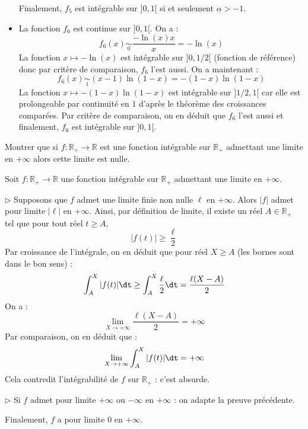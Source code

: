 \documentclass[a4paper,10pt]{report}
\begin{document}
\begin{itemize}
\medskip

\noindent Finalement, $f_5$ est intégrable sur $]0,1[$ si et seulement $\alpha>-1$.
 \item La fonction $f_6$ est continue sur $]0,1[$. On a :
 $$f_6(x) \underset{0}{\sim} \dfrac{- \ln(x) x}{x} = - \ln(x)$$
 La fonction $x \mapsto - \ln(x)$ est intégrable sur $]0,1/2[$ (fonction de référence) donc par critère de comparaison, $f_6$ l'est aussi. On a maintenant :
 $$ f_6(x) \underset{1}{\sim} (x-1) \ln(1-x) = - (1-x)\ln(1-x)$$
 La fonction $x \mapsto -(1-x)\ln(1-x)$ est intégrable sur $]1/2,1[$ car elle est prolongeable par continuité en $1$ d'après le théorème des croissances comparées. Par critère de comparaison, on en déduit que $f_6$ l'est aussi et finalement, $f_6$ est intégrable sur $]0,1[$.
\end{itemize}

\begin{Exa} Montrer que si $f : \mathbb{R}_+ \rightarrow \mathbb{R}$ est une fonction intégrable sur $\mathbb{R}_+$ admettant une limite en $+ \infty$ alors cette limite est nulle. 
\end{Exa} 

\corr Soit $f : \mathbb{R}_+ \rightarrow \mathbb{R}$ une fonction intégrable sur $\mathbb{R}_+$ admettant une limite en $+ \infty$. 

\medskip

\noindent $\rhd$ Supposons que $f$ admet une limite finie non nulle $\ell$ en $+ \infty$. Alors $\vert f \vert $ admet pour limite $\vert \ell \vert$ en $+ \infty$. Ainsi, par définition de limite, il existe un réel $A \in \mathbb{R}_+$ tel que pour tout réel $t \geq A$,
$$ \vert f(t) \vert \geq \dfrac{\ell}{2}$$
Par croissance de l'intégrale, on en déduit que pour réel $X \geq A$ (les bornes sont dans le bon sens) : 
$$ \int_A^{X} \vert f(t) \vert \dt \geq \int_A^{X} \dfrac{\ell}{2} \dt = \dfrac{\ell(X-A)}{2}$$
On a :
$$ \lim_{X \rightarrow + \infty} \dfrac{\ell(X-A)}{2} = + \infty$$
Par comparaison, on en déduit que :
$$  \lim_{X \rightarrow + \infty} \int_A^{X} \vert f(t) \vert \dt = + \infty$$
Cela contredit l'intégrabilité de $f$ sur $\mathbb{R}_+$ : c'est absurde.

\medskip

\noindent $\rhd$ Si $f$ admet pour limite $+ \infty$ ou $-\infty$ en $+ \infty$ : on adapte la preuve précédente.

\medskip

\noindent Finalement, $f$ a pour limite $0$ en $+ \infty$.
\end{document}
